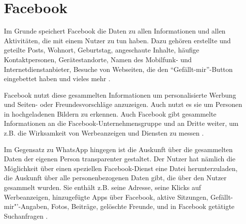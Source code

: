\section{Facebook}
Im Grunde speichert Facebook die Daten zu allen Informationen und allen Aktivitäten, die mit einem Nutzer zu tun haben. Dazu gehören erstellte und geteilte Posts, Wohnort, Geburtstag, angeschaute Inhalte, häufige Kontaktpersonen, Gerätestandorte, Namen des Mobilfunk- und Internetdienstanbieter, Besuche von Webseiten, die den "`Gefällt-mir"'-Button eingebettet haben und vieles mehr \autocite[vgl.][]{FacebookInc..2017}.
\par
Facebook nutzt diese gesammelten Informationen um personalisierte Werbung und Seiten- oder Freundesvorschläge anzuzeigen. Auch nutzt es sie um Personen in hochgeladenen Bildern zu erkennen. Auch Facebook gibt gesammelte Informationen an die Facebook-Unternehmensgruppe und an Dritte weiter, um z.B. die Wirksamkeit von Werbeanzeigen und Diensten zu messen \autocite[vgl.][]{FacebookInc..2017}. 
\par
Im Gegensatz zu WhatsApp hingegen ist die Auskunft über die gesammelten Daten der eigenen Person transparenter gestaltet. Der Nutzer hat nämlich die Möglichkeit über einen speziellen Facebook-Dienst eine Datei herunterzuladen, die Auskunft über alle personenbezogenen Daten gibt, die über den Nutzer gesammelt wurden. Sie enthält z.B. seine Adresse, seine Klicks auf Werbeanzeigen, hinzugefügte Apps über Facebook, aktive Sitzungen, Gefällt-mir"'-Angaben, Fotos, Beiträge, gelöschte Freunde, und in Facebook getätigte Suchanfragen \autocite[vgl.][]{FacebookInc..2017b}.

